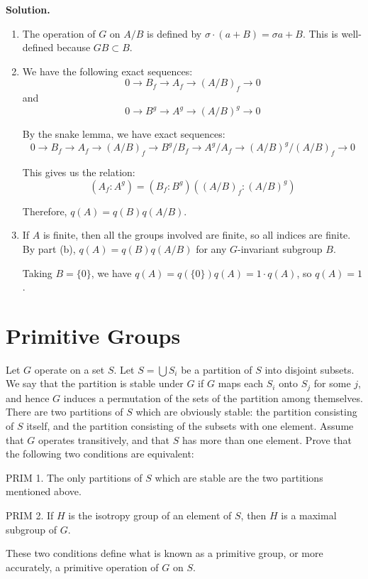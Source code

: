 \noindent\textbf{Solution.}
\begin{enumerate}[label=(\alph*)]
\item The operation of $G$ on $A/B$ is defined by $\sigma \cdot (a + B) = \sigma a + B$. This is well-defined because $GB \subset B$.

\item We have the following exact sequences:
\[0 \to B_f \to A_f \to (A/B)_f \to 0\]
and
\[0 \to B^g \to A^g \to (A/B)^g \to 0\]

By the snake lemma, we have exact sequences:
\[0 \to B_f \to A_f \to (A/B)_f \to B^g/B_f \to A^g/A_f \to (A/B)^g/(A/B)_f \to 0\]

This gives us the relation:
\[(A_f : A^g) = (B_f : B^g)((A/B)_f : (A/B)^g)\]

Therefore, $q(A) = q(B)q(A/B)$.

\item If $A$ is finite, then all the groups involved are finite, so all indices are finite. By part (b), $q(A) = q(B)q(A/B)$ for any $G$-invariant subgroup $B$.

Taking $B = \{0\}$, we have $q(A) = q(\{0\})q(A) = 1 \cdot q(A)$, so $q(A) = 1$.
\end{enumerate}

\section{Primitive Groups}

\begin{problembox}
Let $G$ operate on a set $S$. Let $S = \bigcup S_i$ be a partition of $S$ into disjoint subsets. We say that the partition is stable under $G$ if $G$ maps each $S_i$ onto $S_j$ for some $j$, and hence $G$ induces a permutation of the sets of the partition among themselves. There are two partitions of $S$ which are obviously stable: the partition consisting of $S$ itself, and the partition consisting of the subsets with one element. Assume that $G$ operates transitively, and that $S$ has more than one element. Prove that the following two conditions are equivalent:

PRIM 1. The only partitions of $S$ which are stable are the two partitions mentioned above.

PRIM 2. If $H$ is the isotropy group of an element of $S$, then $H$ is a maximal subgroup of $G$.

These two conditions define what is known as a primitive group, or more accurately, a primitive operation of $G$ on $S$.
\end{problembox}

